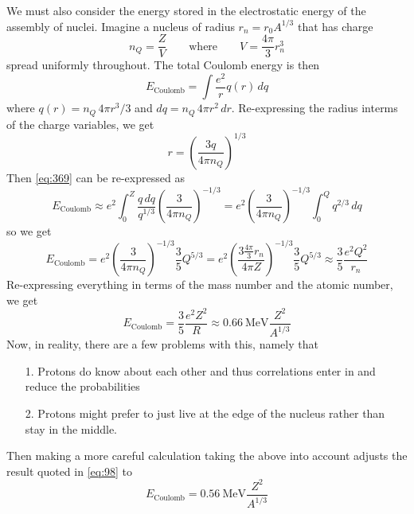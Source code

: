 \documentclass[10pt]{article}
\numberwithin{equation}{section}
\newcommand{\n}{\noindent}
\begin{document}
  \n We must also consider the energy stored in the electrostatic
  energy of the assembly of nuclei. Imagine a nucleus of radius
  $r_n=r_0A^{1/3}$ that has charge
  \begin{equation}
    \label{eq:368}
    n_Q=\frac{Z}{V}\qquad\textrm{where}\qquad V=\frac{4\pi}{3}r_n^3
  \end{equation}
  spread uniformly throughout. The total Coulomb energy is then
  \begin{equation}
    \label{eq:369}
    E_{\mathrm{Coulomb}}=\int \frac{e^2}{r}q(r)\,dq
  \end{equation}
  where $q(r)=n_Q\, 4\pi r^3/3$ and $dq=n_Q\,4\pi
  r^2\,dr$. Re-expressing the radius interms of the charge variables,
  we get
  \begin{equation}
    \label{eq:370}
    r=\left(\frac{3q}{4\pi n_Q}\right)^{1/3}
  \end{equation}
  Then \eqref{eq:369} can be re-expressed as
  \begin{equation}
    \label{eq:371}
    E_{\mathrm{Coulomb}}\approx
      e^2\int_0^Z\frac{q\,dq}{q^{1/3}}\left(\frac{3}{4\pi
          n_Q}\right)^{-1/3}=e^2\left(\frac{3}{4\pi
          n_Q}\right)^{-1/3}\int_0^Q q^{2/3}\,dq
  \end{equation}
  so we get
  \begin{equation}
    \label{eq:372}
    E_{\mathrm{Coulomb}}=e^2\left(\frac{3}{4\pi
        n_Q}\right)^{-1/3}\frac{3}{5}Q^{5/3}=e^2\left(\frac{3\frac{4\pi}{3}r_n}{4\pi
        Z}\right)^{-1/3}\frac{3}{5}Q^{5/3}\approx \frac{3}{5}\frac{e^2Q^2}{r_n}
  \end{equation}
  Re-expressing everything in terms of the mass number and the atomic
  number, we get
  \begin{equation}
    \label{eq:98}
    E_{\mathrm{Coulomb}}=\frac{3}{5}\frac{e^2
      Z^2}{R}\approx 0.66\ \mathrm{MeV}\frac{Z^2}{A^{1/3}}
  \end{equation}
  Now, in reality, there are a few problems with this, namely that
  \begin{enumerate}
  \item[1.] Protons do know about each other and thus correlations
    enter in and reduce the probabilities
  \item[2.] Protons might prefer to just live at the edge of the
    nucleus rather than stay in the middle.
  \end{enumerate}
  Then making a more careful calculation taking the above into account
  adjusts the result quoted in \eqref{eq:98} to
  \begin{equation}
    \label{eq:373}
    E_{\mathrm{Coulomb}}=0.56\ \mathrm{MeV}\frac{Z^2}{A^{1/3}}
  \end{equation}
\end{document}
